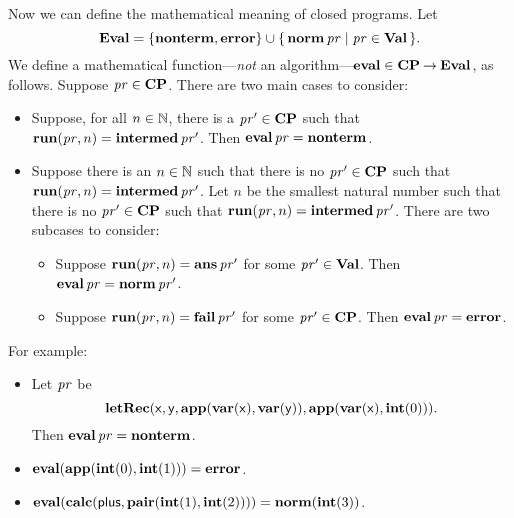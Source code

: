 Now we can define the mathematical meaning of closed programs.
Let
%
%
%
%
%
\begin{displaymath}
\mathbf{Eval} = \{\mathbf{nonterm},\mathbf{error}\}\cup\{ \, \mathbf{norm}\,\mathit{pr} \mid \mathit{pr}\in\mathbf{Val} \, \} .  
\end{displaymath}
We define a mathematical function---\emph{not} an
algorithm---$\mathbf{eval}\in\mathbf{CP}\mathbin{\to}\mathbf{Eval}$, as follows.
Suppose $\mathit{pr}\in\mathbf{CP}$.  There are two main cases to consider:
\begin{itemize}
\item Suppose, for all $n\in\mathbb{N}$, there is a $\mathit{pr}'\in\mathbf{CP}$ such
  that $\mathbf{run}(\mathit{pr},n) = \mathbf{intermed}\,\mathit{pr}'$.  Then $\mathbf{eval}\,\mathit{pr} = \mathbf{nonterm}$.

\item Suppose there is an $n\in\mathbb{N}$ such that there is no
  $\mathit{pr}'\in\mathbf{CP}$ such that $\mathbf{run}(\mathit{pr},n) = \mathbf{intermed}\,\mathit{pr}'$.  Let $n$ be
  the smallest natural number such that there is no $\mathit{pr}'\in\mathbf{CP}$ such
  that $\mathbf{run}(\mathit{pr},n) = \mathbf{intermed}\,\mathit{pr}'$.  There are two subcases to
  consider:
  \begin{itemize}
  \item Suppose $\mathbf{run}(\mathit{pr},n) = \mathbf{ans}\,\mathit{pr}'$ for some $\mathit{pr}'\in\mathbf{Val}$.
    Then $\mathbf{eval}\,\mathit{pr} = \mathbf{norm}\,\mathit{pr}'$.

  \item Suppose $\mathbf{run}(\mathit{pr},n) = \mathbf{fail}\,\mathit{pr}'$ for some $\mathit{pr}'\in\mathbf{CP}$.
    Then $\mathbf{eval}\,\mathit{pr} = \mathbf{error}$.
  \end{itemize}
\end{itemize}

For example:
\begin{itemize}
\item Let $\mathit{pr}$ be
  \begin{displaymath}
    \mathbf{letRec}(\mathsf{x}, \mathsf{y},
                \mathbf{app}(\mathbf{var}(\mathsf{x}), \mathbf{var}(\mathsf{y})),
                \mathbf{app}(\mathbf{var}(\mathsf{x}), \mathbf{int}(0))) .
  \end{displaymath}
  Then $\mathbf{eval}\,\mathit{pr} = \mathbf{nonterm}$.

\item $\mathbf{eval}(\mathbf{app}(\mathbf{int}(0), \mathbf{int}(1))) = \mathbf{error}$.

\item $\mathbf{eval}(\mathbf{calc}(\mathsf{plus}, \mathbf{pair}(\mathbf{int}(1),\mathbf{int}(2)))) =
  \mathbf{norm}(\mathbf{int}(3))$.
\end{itemize}

%

